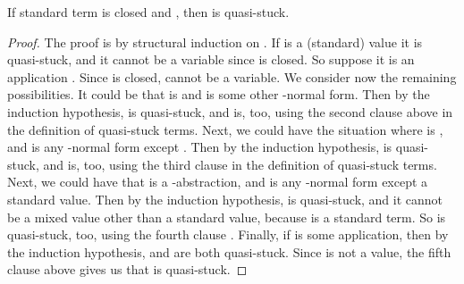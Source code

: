 \documentclass{LMCS}
\begin{document}
\begin{lem}
\label{lem:qsnfb}
If standard term  is closed and , then  is
quasi-stuck.
\end{lem}
\begin{proof}
The proof is by structural induction on .  If  is
a (standard) value it is quasi-stuck, and it cannot be a variable
since  is closed.  So suppose it is an application .
Since  is closed,  cannot be a variable.  We consider now
the remaining possibilities.  It could be that  is  and 
is some other -normal form.  Then by the induction hypothesis,
 is quasi-stuck, and  is, too, using the second clause above
in the definition of quasi-stuck terms.  Next, we could have the
situation where  is , and  is any -normal form except
.  Then by the induction hypothesis,  is quasi-stuck, and 
is, too, using the third clause in the definition of quasi-stuck
terms.  Next, we could have that  is a -abstraction, and
 is any -normal form except a standard value.  Then by the
induction hypothesis,  is quasi-stuck, and it cannot be a mixed
value other than a standard value, because  is a standard term.
So  is quasi-stuck, too, using the fourth clause .  Finally, if
 is some application, then by the induction hypothesis,  and
 are both quasi-stuck.  Since  is not a value, the fifth
clause above gives us that  is quasi-stuck. 
\end{proof}
\end{document}
